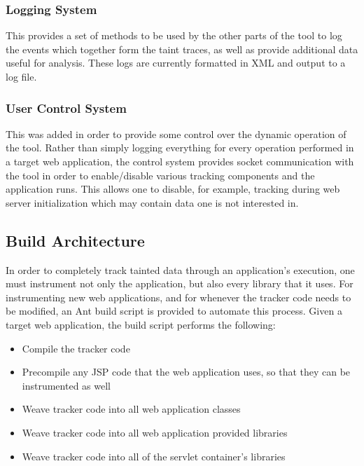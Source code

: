 \documentclass[msc,oneside]{ubcthesis}
\begin{document}
\subsubsection{Logging System}
This provides a set of methods to be used by the other parts of the tool to log the events which together form the taint traces, as well as provide additional data useful for analysis. These logs are currently formatted in XML and output to a log file.

\subsubsection{User Control System} 
This was added in order to provide some control over the dynamic operation of the tool. Rather than simply logging everything for every operation performed in a target web application, the control system provides socket communication with the tool in order to enable/disable various tracking components and the application runs. This allows one to disable, for example, tracking during web server initialization which may contain data one is not interested in.

\subsection{Build Architecture}

In order to completely track tainted data through an application's execution, one must instrument not only the application, but also every library that it uses. For instrumenting new web applications, and for whenever the tracker code needs to be modified, an Ant build script is provided to automate this process. Given a target web application, the build script performs the following:

\begin{itemize}
\item Compile the tracker code
\item Precompile any JSP code that the web application uses, so that they can be instrumented as well
\item Weave tracker code into all web application classes
\item Weave tracker code into all web application provided libraries
\item Weave tracker code into all of the servlet container's libraries
\end{itemize}
\end{document}
